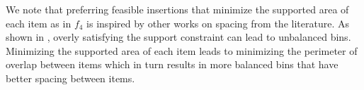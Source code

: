 We note that preferring feasible insertions that minimize the supported area of each item as in $f_4$ is inspired by other works on spacing from the literature.
As shown in \cite{elhedhli2019three}, overly satisfying the support constraint can lead to unbalanced bins.
Minimizing the supported area of each item leads to minimizing the perimeter of overlap between items which in turn results in more balanced bins that have better spacing between items.